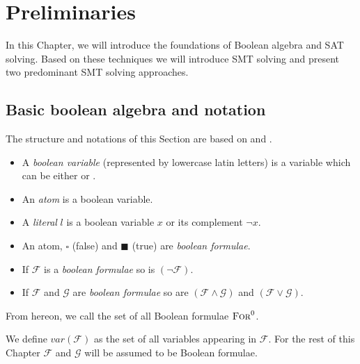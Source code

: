 \chapter{Preliminaries}
\label{ch:preliminaries}
In this Chapter, we will introduce the foundations of Boolean algebra and SAT solving. Based on these techniques we will introduce SMT solving and present two predominant SMT solving approaches.

\section{Basic boolean algebra and notation}
The structure and notations of this Section are based on \cite{Marques-Silva-PropositionalSATSolving} and \cite{fondements-logique}.
\begin{definition}

\begin{itemize}
    \item A \textit{boolean variable} (represented by lowercase latin letters) is a variable which can be either \true or \false.
    \item An \textit{atom} is a boolean variable.
    \item A \textit{literal} $l$ is a boolean variable $x$ or its complement $\neg x$.
\end{itemize}

\end{definition}
\begin{definition}
\begin{itemize}
    \item An atom, $\square$ (false) and $\blacksquare$ (true)  are \textit{boolean formulae}.
    \item If $\mathcal{F}$ is a \textit{boolean formulae} so is $\left(\neg\mathcal{F}\right)$.
    \item If $\mathcal{F}$ and $\mathcal{G}$ are \textit{boolean formulae} so are $\left(\mathcal{F} \land \mathcal{G}\right)$ and $\left(\mathcal{F} \lor \mathcal{G}\right)$.
\end{itemize}
From hereon, we call the set of all Boolean formulae $\textsc{For}^0$.\\
\end{definition}
We define $var(\mathcal{F})$ as the set of all variables appearing in  $\mathcal{F}$. 
For the rest of this Chapter $\mathcal{F}$ and $\mathcal{G}$ will be assumed to be Boolean formulae.

